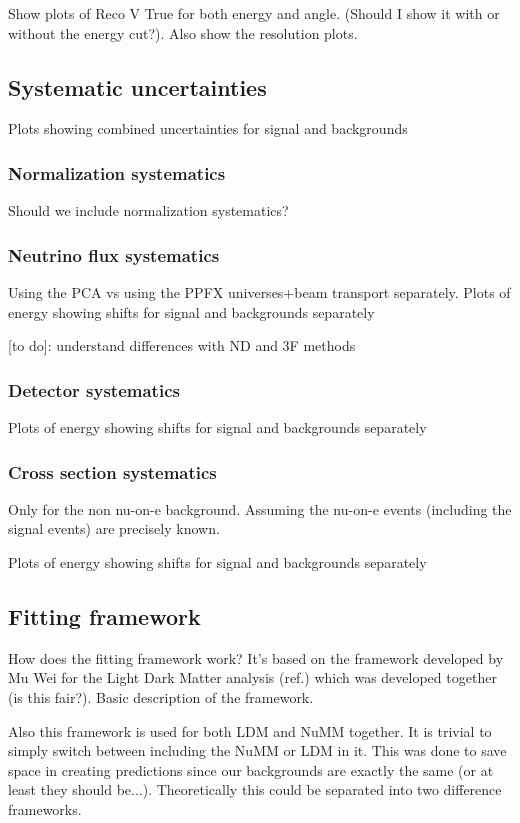 \documentclass[12pt]{article}
\begin{document}
Show plots of Reco V True for both energy and angle. (Should I show it with or without the energy cut?). Also show the resolution plots.

\subsection{Systematic uncertainties}
Plots showing combined uncertainties for signal and backgrounds

\subsubsection*{Normalization systematics}
Should we include normalization systematics?

\subsubsection*{Neutrino flux systematics}
Using the PCA vs using the PPFX universes+beam transport separately. Plots of energy showing shifts for signal and backgrounds separately

[to do]: understand differences with ND and 3F methods

\subsubsection*{Detector systematics}
Plots of energy showing shifts for signal and backgrounds separately
\subsubsection*{Cross section systematics}
Only for the non nu-on-e background. Assuming the nu-on-e events (including the signal events) are precisely known.

Plots of energy showing shifts for signal and backgrounds separately

\subsection{Fitting framework}
How does the fitting framework work? It's based on the framework developed by Mu Wei for the Light Dark Matter analysis (ref.) which was developed together (is this fair?). Basic description of the framework.

Also this framework is used for both LDM and NuMM together. It is trivial to simply switch between including the NuMM or LDM in it. This was done to save space in creating predictions since our backgrounds are exactly the same (or at least they should be...). Theoretically this could be separated into two difference frameworks.
\end{document}
